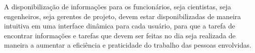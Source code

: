 
A disponibilização de informações para os funcionários, seja cientistas, seja engenheiros, seja gerentes de projeto, devem estar disponibilizadas de maneira intuitiva em uma interface dinâmica para cada usuário, para que a tarefa de encontrar informações e tarefas que devem ser feitas no dia seja realizada de maneira a aumentar a eficiência e praticidade do trabalho das pessoas envolvidas.